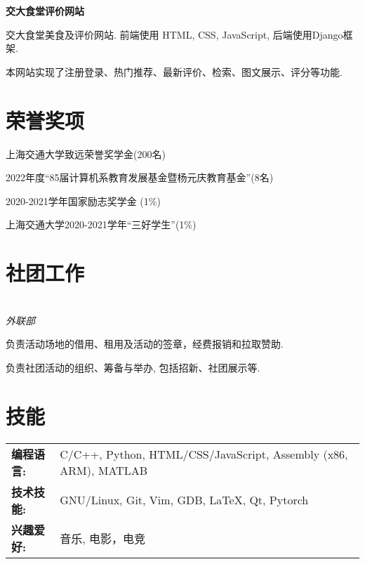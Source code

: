 \documentclass{cv_cn}
\begin{document}
\textbf{交大食堂评价网站}\enskip \underline{\href{https://github.com/WxxW2002/SJTU-canteen}{\faGithub}}
\begin{zitemize}
  \item 交大食堂美食及评价网站. 前端使用 HTML, CSS, JavaScript, 后端使用Django框架.
  \item 本网站实现了注册登录、热门推荐、最新评价、检索、图文展示、评分等功能.
\end{zitemize}

\section{荣誉奖项}
\begin{zitemize}
  \item 上海交通大学致远荣誉奖学金(200名)
  \item 2022年度“85届计算机系教育发展基金暨杨元庆教育基金”(8名)
  \item 2020-2021学年国家励志奖学金 (1\%)
  \item 上海交通大学2020-2021学年“三好学生”(1\%)
\end{zitemize}

\section{社团工作}
\\
\textit{外联部} 
\begin{zitemize}
  \item 负责活动场地的借用、租用及活动的签章，经费报销和拉取赞助.
  \item 负责社团活动的组织、筹备与举办, 包括招新、社团展示等.
\end{zitemize}

\section{技能}
\begin{tabular}[t]{ll}
  \textbf{编程语言:} & C/C++, Python, HTML/CSS/JavaScript, Assembly (x86, ARM), MATLAB\\
  \textbf{技术技能:} & GNU/Linux, Git, Vim, GDB, \LaTeX, Qt,  Pytorch\\
  \textbf{兴趣爱好:} & 音乐, 电影，电竞 
\end{tabular}
\end{document}
